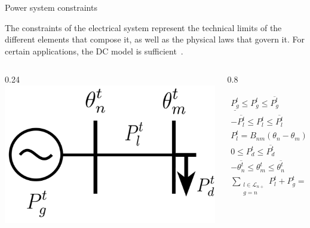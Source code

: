 \documentclass[hyperref={colorlinks,citecolor=blue,linkcolor=blue,urlcolor=blue}]{beamer}
\begin{document}
\begin{frame}{Power system constraints}

The constraints of the electrical system represent the technical limits of the different elements that compose it, as well as the physical laws that govern it. For certain applications, the DC model is sufficient~\cite{8468081}.

\begin{columns}
\begin{column}{0.24\textwidth}
\vspace{3pt}
    \includegraphics[width=1.4\textwidth]{figures/power_dummy_constraint.png}
\end{column}
\begin{column}{0.8\textwidth}  %

\begin{subequations}
\begin{alignat}{4}
    \underline{P_g^t} \leq P_{g}^t \leq \overline{P_g^t} &\quad \forall \ g \in \mathcal{G}, \label{eq:gen_limits} \\
    -\overline{P_l^t} \leq P_{l}^t \leq \overline{P_l^t} &\quad \forall \ l \in \mathcal{L}, \label{eq:line_limits} \\
    P_{l}^t = B_{nm}(\theta_n - \theta_{m}) &\quad \forall \ l = (n, m) \in \mathcal{L} , \label{eq:dc_power_flow} \\
    0 \leq P_{d}^t \leq \overline{P_{d}^t} &\quad \forall \ d \in \mathcal{D}, \label{eq:dem_limit_power} \\
    -\overline{\theta_{n}^t} \leq \theta_{m}^t \leq \overline{\theta_{n}^t} &\quad \forall \ n \in \mathcal{N}_P, \label{eq:voltage_angle_limits} \\
    \sum_{\substack{l\in \mathcal{L}_{n+}\\g=n}}{P_{l}^t + P_{g}^t} =  \sum_{\substack{l\in \mathcal{L}_{n-}\\d=n}} P_{l}^t + P_{d}^t &\quad \forall \ n \in \mathcal{N}_P \label{eq:power_balance} 
\end{alignat}
\end{subequations}


\end{column}
\end{columns}
\end{frame}
\end{document}
